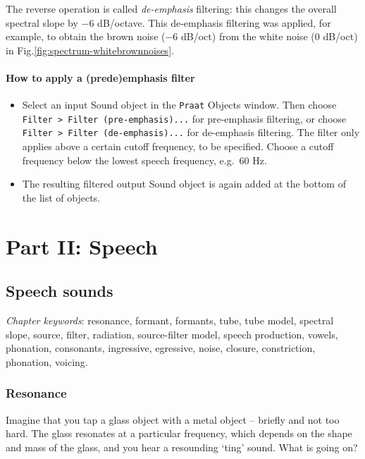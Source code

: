 \documentclass[
]{book}
\begin{document}
The reverse operation is called \emph{de-emphasis} filtering: this changes the overall spectral slope by \(-6\) dB/octave. This de-emphasis filtering was applied, for example, to obtain the brown noise (\(-6\) dB/oct) from the white noise (\(0\) dB/oct) in Fig.\ref{fig:spectrum-whitebrownnoises}.

\label{box-praatemphasis}
\subsection{How to apply a (pre\textbar de)emphasis filter}\label{how-to-apply-a-predeemphasis-filter}

\begin{itemize}
\item
  Select an input Sound object in the \texttt{Praat} Objects window. Then choose \texttt{Filter\ \textgreater{}\ Filter\ (pre-emphasis)...} for pre-emphasis filtering, or choose \texttt{Filter\ \textgreater{}\ Filter\ (de-emphasis)...} for de-emphasis filtering. The filter only applies above a certain cutoff frequency, to be specified. Choose a cutoff frequency below the lowest speech frequency, e.g.~60 Hz.
\item
  The resulting filtered output Sound object is again added at the bottom of the list of objects.
\end{itemize}

\part*{Part II: Speech}\label{part-part-ii-speech}

\chapter{Speech sounds}\label{ch-speechsounds}

\emph{Chapter keywords}: resonance, formant, formants, tube, tube model, spectral slope, source, filter, radiation, source-filter model, speech production, vowels, phonation, consonants, ingressive, egressive, noise, closure, constriction, phonation, voicing.

\section{Resonance}\label{sec:resonance}

Imagine that you tap a glass object with a metal object -- briefly and not too hard. The glass resonates at a particular frequency, which depends on the shape and mass of the glass, and you hear a resounding `ting' sound. What is going on?
\end{document}
